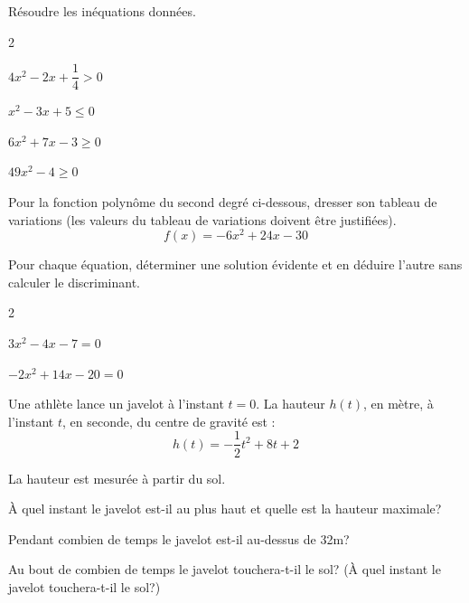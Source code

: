 \documentclass[12pt,a4paper]{article}  %
\begin{document}
\vspace{-0.3cm}

Résoudre les inéquations données.
\begin{multicols}{2}
\begin{enumMet}
    \item $4 x^{2}-2 x+\dfrac{1}{4}>0$
    \item {} $x^{2}-3 x+5 \leqslant 0$
    \item $6 x^{2}+7 x-3 \geqslant 0$
    \item $49 x^{2}-4 \geqslant 0$
\end{enumMet}
\end{multicols}

\vspace{-0.3cm}
Pour la fonction polynôme du second degré ci-dessous, dresser son tableau de variations (les valeurs du tableau de variations doivent être justifiées).
$$f(x)=-6x^2+24x-30$$

\vspace{-0.3cm}

Pour chaque équation, déterminer une solution évidente et en déduire l'autre sans calculer le discriminant.
\begin{multicols}{2}
\begin{enumMet}
    \item $3x^2-4x-7=0$
    \item $-2x^2+14x-20=0$
\end{enumMet}
\end{multicols}

\newpage


Une athlète lance un javelot à l'instant $t=0$. La hauteur $h(t)$, en mètre, à l'instant $t$, en seconde, du centre de gravité est :
$$
h(t)=-\frac{1}{2} t^2+8 t+2
$$

La hauteur est mesurée à partir du sol.
\begin{enumMet}
	\item À quel instant le javelot est-il au plus haut et quelle est la hauteur maximale?
	\item Pendant combien de temps le javelot est-il au-dessus de 32m?
	\item Au bout de combien de temps le javelot touchera-t-il le sol? (À quel instant le javelot touchera-t-il le sol?)
\end{enumMet}
\end{document}
